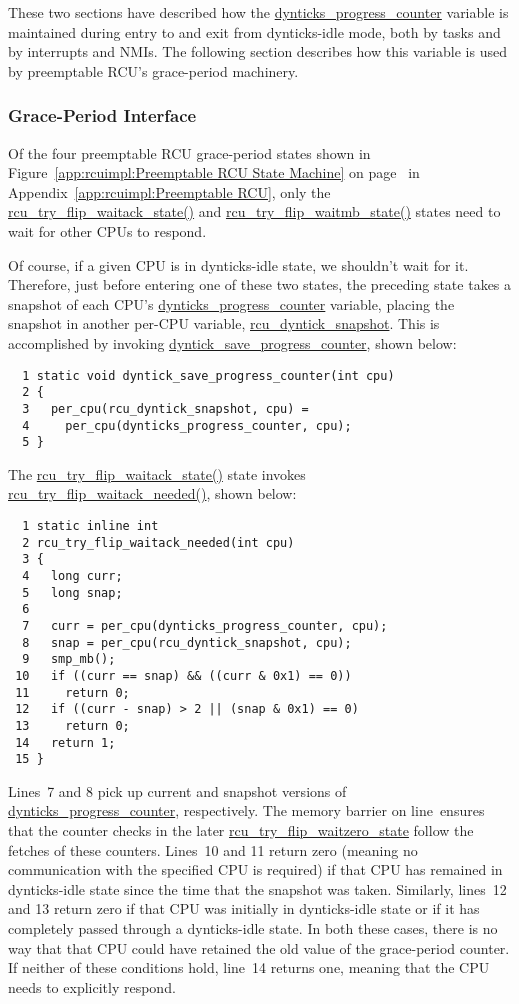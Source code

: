 These two sections have described how the
\url{dynticks_progress_counter} variable is maintained during
entry to and exit from dynticks-idle mode, both by tasks and by
interrupts and NMIs.
The following section describes how this variable is used by
preemptable RCU's grace-period machinery.

\subsubsection{Grace-Period Interface}
\label{app:formal:Grace-Period Interface}

Of the four preemptable RCU grace-period states shown in
Figure~\ref{app:rcuimpl:Preemptable RCU State Machine} on
page~\pageref{app:rcuimpl:Preemptable RCU State Machine} in
Appendix~\ref{app:rcuimpl:Preemptable RCU},
only the \url{rcu_try_flip_waitack_state()}
and \url{rcu_try_flip_waitmb_state()} states need to wait
for other CPUs to respond.

Of course, if a given CPU is in dynticks-idle state, we shouldn't
wait for it.
Therefore, just before entering one of these two states,
the preceding state takes a snapshot of each CPU's
\url{dynticks_progress_counter} variable, placing the
snapshot in another per-CPU variable,
\url{rcu_dyntick_snapshot}.
This is accomplished by invoking
\url{dyntick_save_progress_counter}, shown below:

{ \scriptsize
\begin{verbatim}
  1 static void dyntick_save_progress_counter(int cpu)
  2 {
  3   per_cpu(rcu_dyntick_snapshot, cpu) =
  4     per_cpu(dynticks_progress_counter, cpu);
  5 }
\end{verbatim}
}

The \url{rcu_try_flip_waitack_state()} state invokes
\url{rcu_try_flip_waitack_needed()}, shown below:
 
{ \scriptsize
\begin{verbatim}
  1 static inline int
  2 rcu_try_flip_waitack_needed(int cpu)
  3 {
  4   long curr;
  5   long snap;
  6 
  7   curr = per_cpu(dynticks_progress_counter, cpu);
  8   snap = per_cpu(rcu_dyntick_snapshot, cpu);
  9   smp_mb();
 10   if ((curr == snap) && ((curr & 0x1) == 0))
 11     return 0;
 12   if ((curr - snap) > 2 || (snap & 0x1) == 0)
 13     return 0;
 14   return 1;
 15 }
\end{verbatim}
}

Lines~7 and 8 pick up current and snapshot versions of
\url{dynticks_progress_counter}, respectively.
The memory barrier on line~ensures that the counter checks
in the later \url{rcu_try_flip_waitzero_state} follow
the fetches of these counters.
Lines~10 and 11 return zero (meaning no communication with the
specified CPU is required) if that CPU has remained in dynticks-idle
state since the time that the snapshot was taken.
Similarly, lines~12 and 13 return zero if that CPU was initially
in dynticks-idle state or if it has completely passed through a
dynticks-idle state.
In both these cases, there is no way that that CPU could have retained
the old value of the grace-period counter.
If neither of these conditions hold, line~14 returns one, meaning
that the CPU needs to explicitly respond.

